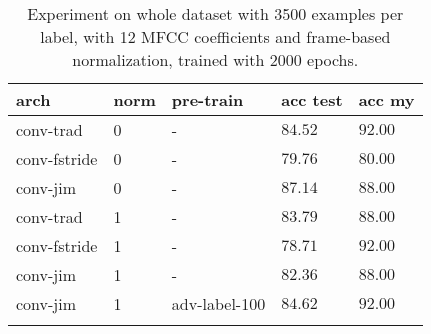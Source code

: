 \begin{table}[ht!]
\small
\begin{center}
\caption{Experiment on whole dataset with 3500 examples per label, with 12 MFCC coefficients and frame-based normalization, trained with 2000 epochs.}
\begin{tabular}{ M{3cm}  M{1cm}  M{2cm}  M{2.5cm}  M{2.5cm} }
\toprule
\textbf{arch} & \textbf{norm} & \textbf{pre-train} & \textbf{acc test} & \textbf{acc my} \\
\midrule
conv-trad & 0 & - & $84.52$ & $92.00$ \\
conv-fstride & 0 & - & $79.76$ & $80.00$ \\
conv-jim & 0 & - & $87.14$ & $88.00$ \\
\midrule
conv-trad & 1 & - & $83.79$ & $88.00$ \\
conv-fstride & 1 & - & $78.71$ & $92.00$ \\
conv-jim & 1 & - & $82.36$ & $88.00$ \\
\midrule
conv-jim & 1 & adv-label-100 & $84.62$ & $92.00$ \\
\bottomrule
\label{tab:exp_final_l12}
\end{tabular}
\end{center}
\vspace{-4mm}
\end{table}
\FloatBarrier
\noindent